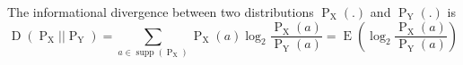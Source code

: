 The informational divergence between two distributions $\operatorname{P}_{\operatorname{X}}(.)$ and $\operatorname{P}_{\operatorname{Y}}(.)$  is
$$\operatorname{D}(\operatorname{P}_{\operatorname{X}} || \operatorname{P}_{\operatorname{Y}}) = \sum\limits_{a \in \operatorname{supp}(\operatorname{P}_{\operatorname{X}})} \operatorname{P}_{\operatorname{X}}(a) \log_{2} \frac{\operatorname{P}_{\operatorname{X}}(a)}{\operatorname{P}_{\operatorname{Y}}(a)} = \operatorname{E}(\log_{2} \frac{\operatorname{P}_{\operatorname{X}}(a)}{\operatorname{P}_{\operatorname{Y}}(a)})$$

